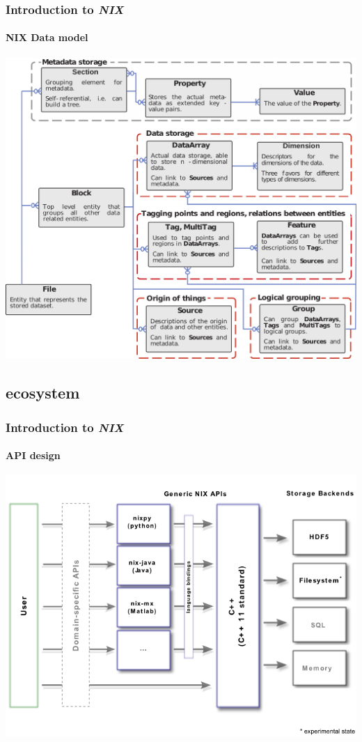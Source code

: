 \documentclass[pdftex, xcolor=table]{beamer}
\newcommand{\nix}{\textit{NIX}}
\begin{document}
\begin{frame}
  \frametitle{Introduction to \nix{}}
  \framesubtitle{NIX Data model}
  \begin{center}
    \includegraphics[width=0.85\linewidth]{images/data_model_brief.png}
  \end{center}
\end{frame}

\subsection{ecosystem}

\begin{frame}[fragile]
  \frametitle{Introduction to \nix{}}
  \framesubtitle{API design}
  \begin{center}
    \includegraphics[width=0.95\linewidth]{images/api_design.png}
  \end{center}
\end{frame}
\end{document}
